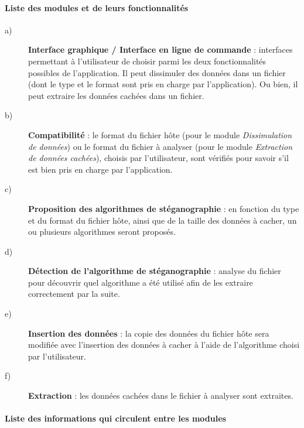 \documentclass[11pt]{article}
\begin{document}
\paragraph{Liste des modules et de leurs fonctionnalités}
\begin{description}
\item[a)] \textbf{Interface graphique / Interface en ligne de commande} : interfaces permettant à l'utilisateur de choisir parmi les deux fonctionnalités possibles de l'application. 
Il peut dissimuler des données dans un fichier (dont le type et le format sont pris en charge par l'application). Ou bien, il peut extraire les données cachées dans un fichier. 

\item[b)] \textbf{Compatibilité} : le format du fichier hôte (pour le module \textit{Dissimulation de données}) ou le format du fichier à analyser (pour le module \textit{Extraction de données cachées}), 
choisis par l'utilisateur, sont vérifiés pour savoir s'il est bien pris en charge par l'application. 

\item[c)] \textbf{Proposition des algorithmes de stéganographie} : en fonction du type et du format du fichier hôte, ainsi que de la taille des données à cacher, 
un ou plusieurs algorithmes seront proposés. 

\item[d)] \textbf{Détection de l'algorithme de stéganographie} : analyse du fichier pour découvrir quel algorithme a été utilisé afin de les extraire correctement par la suite. 

\item[e)] \textbf{Insertion des données} : la copie des données du fichier hôte sera modifiée avec l'insertion des données à cacher à l'aide de l'algorithme choisi par l'utilisateur. 

\item[f)] \textbf{Extraction} : les données cachées dans le fichier à analyser sont extraites. 

\end{description}

\paragraph{Liste des informations qui circulent entre les modules}
\end{document}
